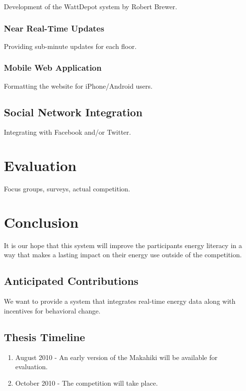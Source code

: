 Development of the WattDepot system by Robert Brewer.

\subsection{Near Real-Time Updates}

Providing sub-minute updates for each floor.

\subsection{Mobile Web Application}

Formatting the website for iPhone/Android users.

\section{Social Network Integration}
\label{socialint}

Integrating with Facebook and/or Twitter.


\chapter{Evaluation}
\label{evaluation}

Focus groups, surveys, actual competition.

\chapter{Conclusion}
\label{conclusion}

It is our hope that this system will improve the participants energy literacy in a way that makes a lasting impact on their energy use outside of the competition.

\section{Anticipated Contributions}

We want to provide a system that integrates real-time energy data along with incentives for behavioral change.

\section{Thesis Timeline}

\begin{enumerate}
\item August 2010 - An early version of the Makahiki will be available for evaluation.
\item October 2010 - The competition will take place.
\end{enumerate}